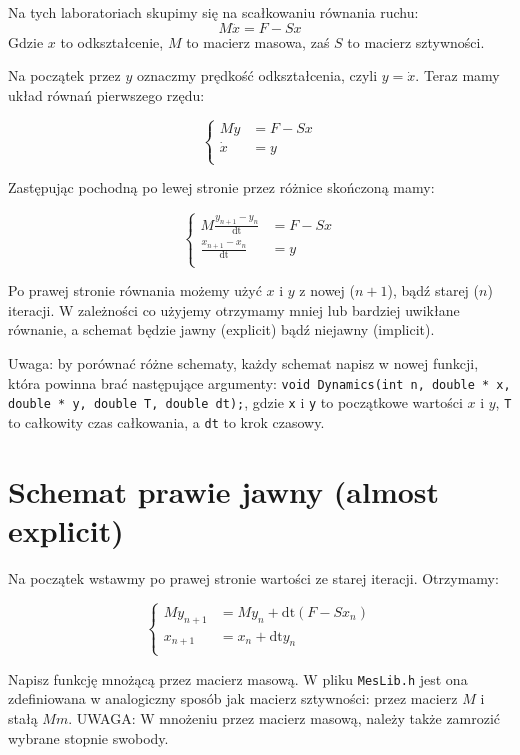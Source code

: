 \documentclass{instrukcja}
\begin{document}
\author{Ł. Łaniewski-Wołłk}
\materialtitle

Na tych laboratoriach skupimy się na scałkowaniu równania ruchu:
\[M\ddot{x} = F - Sx\]
Gdzie $x$ to odkształcenie, $M$ to macierz masowa, zaś $S$ to macierz sztywności.

Na początek przez $y$ oznaczmy prędkość odkształcenia, czyli $y = \dot{x}$. Teraz mamy układ równań pierwszego rzędu:

\[\begin{cases}
M\dot{y} &= F - Sx\\
\dot{x} &= y\\
\end{cases}\]

Zastępując pochodną po lewej stronie przez różnice skończoną mamy:

\[\begin{cases}
M\frac{y_{n+1}-y_n}{\text{dt} } &= F - Sx\\
\frac{x_{n+1}-x_n}{\text{dt} } &= y\\
\end{cases}\]

Po prawej stronie równania możemy użyć $x$ i $y$ z nowej ($n+1$), bądź starej ($n$) iteracji. W zależności co użyjemy otrzymamy mniej lub bardziej uwikłane równanie, a schemat będzie jawny (explicit) bądź niejawny (implicit).

Uwaga: by porównać różne schematy, każdy schemat napisz w nowej funkcji, która powinna brać następujące argumenty: {\tt void Dynamics(int n, double * x, double * y, double T, double dt);}, gdzie {\tt x} i {\tt y} to początkowe wartości $x$ i $y$, {\tt T} to całkowity czas całkowania, a {\tt dt} to krok czasowy.


\section{Schemat prawie jawny (almost explicit)}
Na początek wstawmy po prawej stronie wartości ze starej iteracji. Otrzymamy:

\[\begin{cases}
My_{n+1} &= My_n + \text{dt}( F - Sx_n)\\
x_{n+1} &= x_n + \text{dt} y_n\\
\end{cases}\]

\begin{zad}Napisz funkcję mnożącą przez macierz masową. W pliku {\tt MesLib.h} jest ona zdefiniowana w analogiczny sposób jak macierz sztywności: przez macierz $M$ i stałą $Mm$. UWAGA: W mnożeniu przez macierz masową, należy także zamrozić wybrane stopnie swobody.\end{zad}
\end{document}
